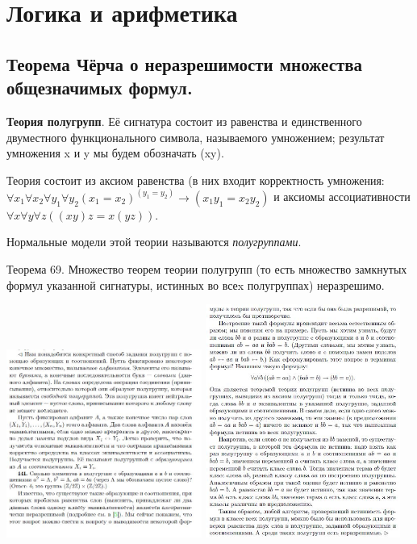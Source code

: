 \section{Логика и арифметика}

\subsection{Теорема Чёрча о неразрешимости множества общезначимых формул.}

\textbf{Теория полугрупп}. Её сигнатура состоит из равенства и единственного двуместного функционального символа, называемого умножением; результат умножения x и y мы будем
обозначать (xy). 

Теория состоит из аксиом равенства (в них входит корректность
умножения: $\forall x_1 \forall x_2 \forall y_1 \forall y_2 (x_1 = x_2) ^ (y_1 = y_2) \rightarrow (x_1y_1 = x_2y_2)$ и аксиомы ассоциативности $\forall x \forall y \forall z ((xy)z = x(yz))$.

Нормальные модели этой теории называются \emph{полугруппами}.

Теорема 69. Множество теорем теории полугрупп (то есть множество замкнутых формул указанной сигнатуры, истинных во всеx полугруппах) неразрешимо.

\begin{center}
    \includegraphics[width=0.48\textwidth]{images/1.1_church1}
    \includegraphics[width=0.48\textwidth]{images/1.1_church2}
\end{center}

